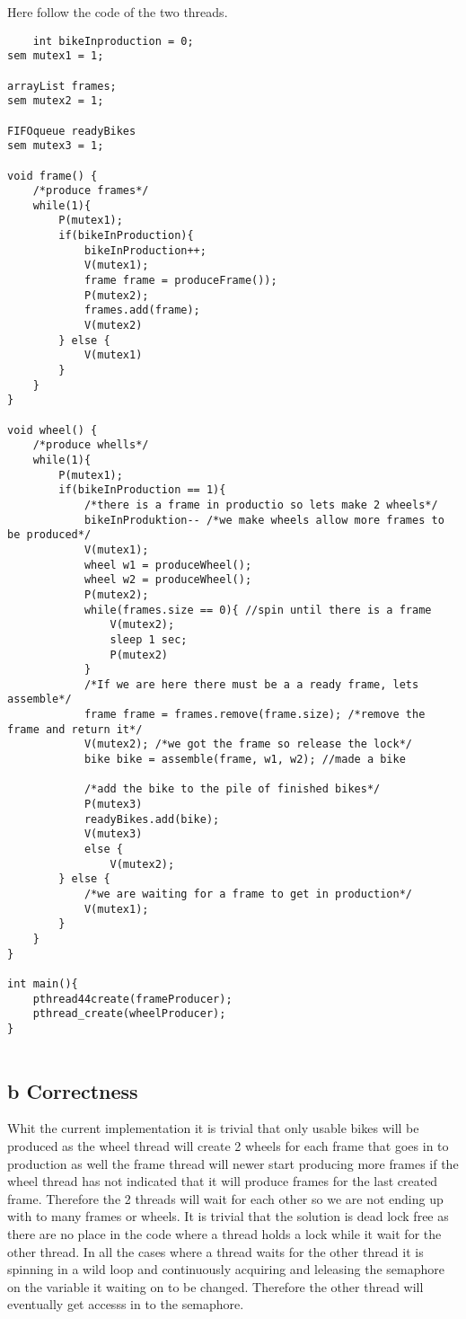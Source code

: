 \documentclass[a4paper,12pt,danish]{report}
\begin{document}
  
Here follow the code of the two threads.

\begin{verbatim}
	int bikeInproduction = 0;
sem mutex1 = 1;

arrayList frames;
sem mutex2 = 1;

FIFOqueue readyBikes
sem mutex3 = 1;

void frame() {
    /*produce frames*/
    while(1){
        P(mutex1);
        if(bikeInProduction){
            bikeInProduction++;
            V(mutex1);
            frame frame = produceFrame());
            P(mutex2);
            frames.add(frame);
            V(mutex2)  
        } else {
            V(mutex1)
        }
    }
}

void wheel() {
    /*produce whells*/
    while(1){
        P(mutex1);
        if(bikeInProduction == 1){
            /*there is a frame in productio so lets make 2 wheels*/
            bikeInProduktion-- /*we make wheels allow more frames to be produced*/
            V(mutex1);
            wheel w1 = produceWheel();
            wheel w2 = produceWheel();
            P(mutex2);
            while(frames.size == 0){ //spin until there is a frame
                V(mutex2);
                sleep 1 sec;
                P(mutex2)
            }
            /*If we are here there must be a a ready frame, lets assemble*/
            frame frame = frames.remove(frame.size); /*remove the frame and return it*/
            V(mutex2); /*we got the frame so release the lock*/
            bike bike = assemble(frame, w1, w2); //made a bike

            /*add the bike to the pile of finished bikes*/
            P(mutex3)
            readyBikes.add(bike);
            V(mutex3)
            else {
                V(mutex2);
        } else {
            /*we are waiting for a frame to get in production*/
            V(mutex1);
        }
    }
}

int main(){
    pthread44create(frameProducer);
    pthread_create(wheelProducer);
}
	
\end{verbatim}  
\subsection{b Correctness}
Whit the current implementation it is trivial that only usable bikes will be
produced as the wheel thread will create 2 wheels for each frame that goes in to
production as well the frame thread will newer start producing more frames if
the wheel thread has not indicated that it will produce frames for the last
created frame. Therefore the 2 threads will wait for each other so we are not
ending up with to many frames or wheels.
It is trivial that the solution is dead lock free as there are no place in the
code where a thread holds a lock while it wait for the other thread. In all the
cases where a thread waits for the other thread it is spinning in a wild loop and
continuously acquiring and leleasing the semaphore on the variable it waiting on
to be changed. Therefore the other thread will eventually get accesss in to the
semaphore.
\end{document}
